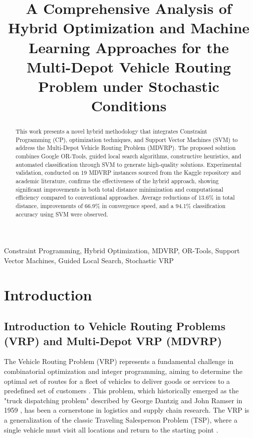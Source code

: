 \documentclass[conference]{IEEEtran} %
\title{A Comprehensive Analysis of Hybrid Optimization and Machine Learning Approaches for the Multi-Depot Vehicle Routing Problem under Stochastic Conditions}
\author{
    \IEEEauthorblockN{Alexander Quispe Holguín}
    \IEEEauthorblockA{
        National University of the Altiplano - Puno, Peru\\
        Faculty of Statistical and Computer Science Engineering\\
        Email: 77210924@unap.edu.pe
    }
}
\begin{document}
\maketitle

\begin{abstract}
This work presents a novel hybrid methodology that integrates Constraint Programming (CP), optimization techniques, and Support Vector Machines (SVM) to address the Multi-Depot Vehicle Routing Problem (MDVRP). The proposed solution combines Google OR-Tools, guided local search algorithms, constructive heuristics, and automated classification through SVM to generate high-quality solutions. Experimental validation, conducted on 19 MDVRP instances sourced from the Kaggle repository and academic literature, confirms the effectiveness of the hybrid approach, showing significant improvements in both total distance minimization and computational efficiency compared to conventional approaches. Average reductions of 13.6\% in total distance, improvements of 66.9\% in convergence speed, and a 94.1\% classification accuracy using SVM were observed.
\end{abstract}

\begin{IEEEkeywords}
Constraint Programming, Hybrid Optimization, MDVRP, OR-Tools, Support Vector Machines, Guided Local Search, Stochastic VRP
\end{IEEEkeywords}

\section{Introduction}

\subsection{Introduction to Vehicle Routing Problems (VRP) and Multi-Depot VRP (MDVRP)}
The Vehicle Routing Problem (VRP) represents a fundamental challenge in combinatorial optimization and integer programming, aiming to determine the optimal set of routes for a fleet of vehicles to deliver goods or services to a predefined set of customers \cite{toth2014vehicle}. This problem, which historically emerged as the "truck dispatching problem" described by George Dantzig and John Ramser in 1959 \cite{dantzig1959truck}, has been a cornerstone in logistics and supply chain research. The VRP is a generalization of the classic Traveling Salesperson Problem (TSP), where a single vehicle must visit all locations and return to the starting point \cite{pelsmaeker2019or}.
\end{document}
